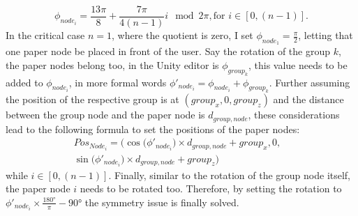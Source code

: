 \documentclass[12pt,a4paper,oneside,american,parskip=half]{article}
\begin{document}
\begin{justify}
\begin{normalsize}
\begin{equation*}
\phi_{node_{i}} = \frac{13\pi}{8} + \frac{7\pi}{4(n - 1)}i \mod 2\pi, \text{for } i \in [0, (n - 1)].
\end{equation*}
In the critical case $n = 1$, where the quotient is zero, I set $\phi_{node_{1}} = \frac{\pi}{2}$, letting that one paper node be placed in front of the user.
Say the rotation of the group $k$, the paper nodes belong too, in the Unity editor is $\phi_{group_k}$, this value needs to be added to $\phi_{node_{i}}$, in more formal words $\phi'_{node_{i}} = \phi_{node_{i}} + \phi_{group_k}$. Further assuming the position of the respective group is at $(group_x, 0, group_z)$ and the distance between the group node and the paper node is $d_{group,node}$, these considerations lead to the following formula to set the positions of the paper nodes:
\begin{align*}
Pos_{Node_{i}} = \Big(\cos \big(\phi'_{node_{i}}\big) \times d_{group,node} + group_x, 0, & \\ 
\sin \big(\phi'_{node_{i}}\big) \times d_{group,node} + group_z \Big) &
\end{align*} while $ i \in [0, (n - 1)]$.
Finally, similar to the rotation of the group node itself, the paper node $i$ needs to be rotated too. Therefore, by setting the rotation to $\phi'_{node_{i}} \times \frac{180°}{\pi} - 90°$ the symmetry issue is finally solved.


\end{normalsize}
\end{justify}
\end{document}
